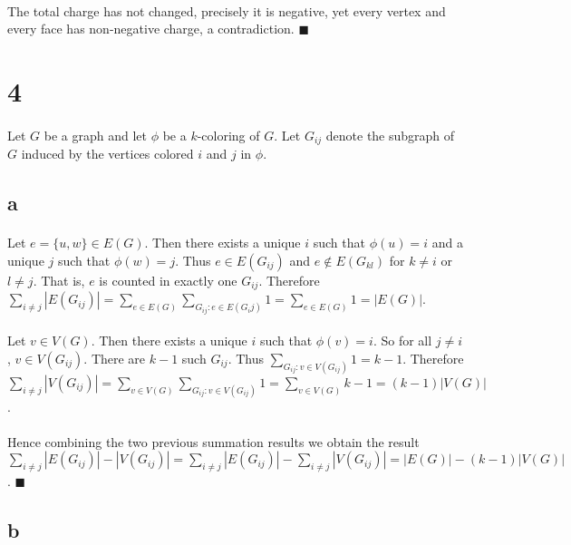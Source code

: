 \documentclass[letterpaper,12pt,oneside,onecolumn]{report}
\begin{document}
\paragraph{}
The total charge has not changed, precisely it is negative, yet every vertex and every face has non-negative charge, a contradiction. $\blacksquare$
\section*{4}
\paragraph{}
Let $G$ be a graph and let $\phi$ be a $k$-coloring of $G$. Let $G_{ij}$ denote the subgraph of $G$ induced by the vertices colored $i$ and $j$ in $\phi$.
\subsection*{a}
\paragraph{}
Let $e = \{u,w\} \in E(G)$. Then there exists a unique $i$ such that $\phi(u) = i$ and a unique $j$ such that $\phi(w) = j$. Thus $e \in E(G_{ij})$ and $e \not\in E(G_{kl})$ for $k \neq i$ or $l \neq j$. That is, $e$ is counted in exactly one $G_{ij}$. Therefore $\sum_{i \neq j} |E(G_{ij})| = \sum_{e \in E(G)} \sum_{G_{ij}: e \in E(G_ij)} 1 = \sum_{e \in E(G)} 1 = |E(G)|$.
\paragraph{}
Let $v \in V(G)$. Then there exists a unique $i$ such that $\phi(v) = i$. So for all $j\neq i$, $v \in V(G_{ij})$. There are $k-1$ such $G_{ij}$. Thus $\sum_{G_{ij}: v \in V(G_{ij})} 1 = k-1$. Therefore $\sum_{i\neq j} |V(G_{ij})| = \sum_{v \in V(G)} \sum_{G_{ij} : v \in V(G_{ij})} 1 = \sum_{v \in V(G)} k-1 = (k-1)|V(G)|$.
\paragraph{}
Hence combining the two previous summation results we obtain the result $\sum_{i\neq j}|E(G_{ij})| - |V(G_{ij})| = \sum_{i\neq j} |E(G_{ij})| - \sum_{i\neq j} |V(G_{ij})| = |E(G)| - (k-1)|V(G)|$. $\blacksquare$
\subsection*{b}
\end{document}
